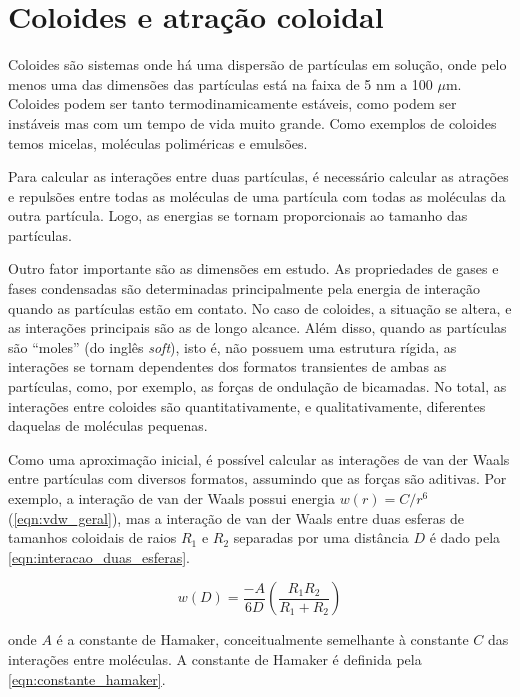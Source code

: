 	\section{Coloides e atração coloidal} 
	\label{sec:coloides_atracao_coloidal}
	Coloides são sistemas onde há uma dispersão de partículas em solução, onde pelo menos uma das dimensões das partículas está na faixa de 5 nm a 100 \(\mu\)m. Coloides podem ser tanto termodinamicamente estáveis, como podem ser instáveis mas com um tempo de vida muito grande. Como exemplos de coloides temos micelas, moléculas poliméricas e emulsões.\cite{Cosgrove2009, Israelachvili2011}
	
	Para calcular as interações entre duas partículas, é necessário calcular as atrações e repulsões entre todas as moléculas de uma partícula com todas as moléculas da outra partícula. Logo, as energias se tornam proporcionais ao tamanho das partículas. 
	
	Outro fator importante são as dimensões em estudo. As propriedades de gases e fases condensadas são determinadas principalmente pela energia de interação quando as partículas estão em contato. No caso de coloides, a situação se altera, e as interações principais são as de longo alcance. Além disso, quando as partículas são ``moles'' (do inglês \emph{soft}), isto é, não possuem uma estrutura rígida, as interações se tornam dependentes dos formatos transientes de ambas as partículas, como, por exemplo, as forças de ondulação de bicamadas. No total, as interações entre coloides são quantitativamente, e qualitativamente, diferentes daquelas de moléculas pequenas.
	
	Como uma aproximação inicial, é possível calcular as interações de van der Waals entre partículas com diversos formatos, assumindo que as forças são aditivas. Por exemplo, a interação de van der Waals possui energia \(w(r) = C/r^6\) (\autoref{eqn:vdw_geral}), mas a interação de van der Waals entre duas esferas de tamanhos coloidais de raios \(R_1\) e \(R_2\) separadas por uma distância \(D\) é dado pela \autoref{eqn:interacao_duas_esferas}. 
	
	\begin{equation}
		w(D) = \dfrac{-A}{6D} \left( \dfrac{R_1R_2}{R_1 + R_2}   \right)
		\label{eqn:interacao_duas_esferas}
	\end{equation}
	
	\noindent onde \(A\) é a constante de Hamaker, conceitualmente semelhante à constante \(C\) das interações entre moléculas. A constante de Hamaker é definida pela \autoref{eqn:constante_hamaker}. 
	
